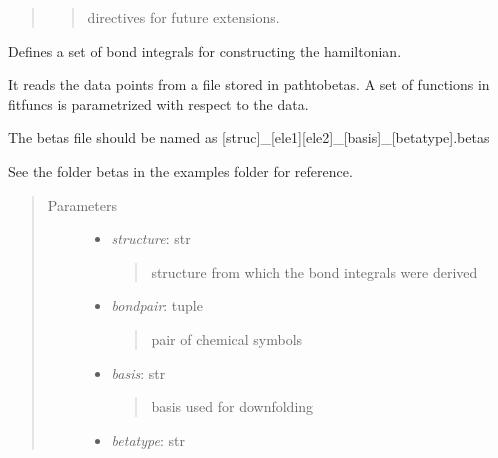\documentclass[letterpaper,10pt,english]{sphinxmanual}
\begin{document}
\begin{fulllineitems}
\begin{fulllineitems}
\begin{quote}
\begin{description}
\begin{itemize}
\begin{quote}
directives for future extensions.
\end{quote}

\end{itemize}

\end{description}\end{quote}

\end{fulllineitems}


\end{fulllineitems}

\label{classes:module-beta}

\begin{fulllineitems}
\label{classes:beta.Beta}
Defines a set of bond integrals for constructing the hamiltonian.

It reads the data points from a file stored in pathtobetas. 
A set of functions in fitfuncs is parametrized with respect to the data.

The betas file should be named as 
{[}struc{]}\_{[}ele1{]}{[}ele2{]}\_{[}basis{]}\_{[}betatype{]}.betas

See the folder betas in the examples folder for reference.
\begin{quote}\begin{description}
\item[{Parameters}] \leavevmode\begin{itemize}
\item {} 
\emph{structure}: str
\begin{quote}

structure from which the bond integrals were derived
\end{quote}

\item {} 
\emph{bondpair}: tuple
\begin{quote}

pair of chemical symbols
\end{quote}

\item {} 
\emph{basis}: str
\begin{quote}

basis used for downfolding
\end{quote}

\item {} 
\emph{betatype}: str
\begin{quote}


\end{quote}
\end{itemize}
\end{description}
\end{quote}
\end{fulllineitems}
\end{document}
